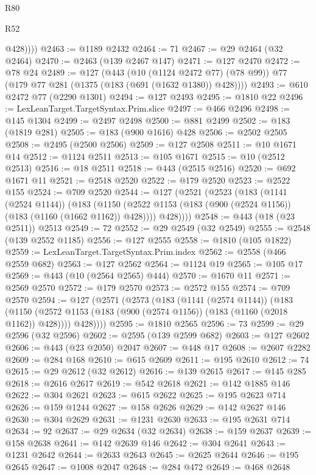 \begin{lexlean}{R80}
\begin{lexlean}{R52}
\begin{coremodule}
{{{{{{{{{{{{{{{{{{{{{{{{{{{{{{{{{{{{{{{{{{{{{{{{{{{{{{{{{{{{{{{{{{{{{{{{{{{{{{{{{{{{{{{{{{{{{{{{{{{{{{{{{{{{{{{{{{{{{{{{{{{{{{{{{{{{{{{{{{{{{{{{{{{{{{{{{{{{{{{{{{{{{{{{{{{{{{{{{{{{{{{{{{{{{{{{{{{{{{            @428))))
@2463 := @1189 @2432
@2464 := 71
@2467 := @29 @2464 (@32 @2464)
@2470 := @2463 (@139 @2467 @147)
@2471 := @127 @2470
@2472 := @78 @24
@2489 := @127
    (@443
      (@10 (@1124 @2472 @77) (@78 @99))
      @77
      (@179 @77 @281 (@1375 (@183 (@691 (@1632 @1380)) @428))))
@2493 := @610 @2472 @77 (@2290 @1301)
@2494 := @127 @2493
@2495 := @1810 @22
@2496 := LexLeanTarget.TargetSyntax.Prim.slice
@2497 := @466 @2496
@2498 := @145 @1304
@2499 := @2497 @2498
@2500 := @881 @2499
@2502 := @183 (@1819 @281)
@2505 := @183 (@900 @1616) @428
@2506 := @2502 @2505
@2508 := @2495 (@2500 @2506)
@2509 := @127 @2508
@2511 := @10 @1671 @14
@2512 := @1124 @2511
@2513 := @105 @1671
@2515 := @10 (@2512 @2513)
@2516 := @18 @2511
@2518 := @443 (@2515 @2516)
@2520 := @692 @1671 @11
@2521 := @2518 @2520
@2522 := @179 @2520
@2523 := @2522 @155
@2524 := @709 @2520
@2544 := @127
    (@2521
      (@2523
        (@183
          (@1141 (@2524 @1144))
          (@183
            (@1150 (@2522 @1153 (@183 (@900 (@2524 @1156)) (@183 (@1160 (@1662 @1162)) @428))))
            @428))))
@2548 := @443 (@18 (@23 @2511)) @2513
@2549 := 72
@2552 := @29 @2549 (@32 @2549)
@2555 := @2548 (@139 @2552 @1185)
@2556 := @127 @2555
@2558 := @1810 (@105 @1822)
@2559 := LexLeanTarget.TargetSyntax.Prim.index
@2562 := @2558 (@466 @2559 @682)
@2563 := @127 @2562
@2564 := @1124 @19
@2565 := @105 @17
@2569 := @443 (@10 (@2564 @2565) @444)
@2570 := @1670 @11
@2571 := @2569 @2570
@2572 := @179 @2570
@2573 := @2572 @155
@2574 := @709 @2570
@2594 := @127
    (@2571
      (@2573
        (@183
          (@1141 (@2574 @1144))
          (@183
            (@1150 (@2572 @1153 (@183 (@900 (@2574 @1156)) (@183 (@1160 (@2018 @1162)) @428))))
            @428))))
@2595 := @1810 @2565
@2596 := 73
@2599 := @29 @2596 (@32 @2596)
@2602 := @2595 (@139 @2599 @682)
@2603 := @127 @2602
@2606 := @443 (@23 @2050) @2047
@2607 := @448 @17
@2608 := @2607 @2282
@2609 := @284 @168
@2610 := @615 @2609
@2611 := @195 @2610
@2612 := 74
@2615 := @29 @2612 (@32 @2612)
@2616 := @139 @2615
@2617 := @145 @285
@2618 := @2616 @2617
@2619 := @542 @2618
@2621 := @142 @1885 @146
@2622 := @304 @2621
@2623 := @615 @2622
@2625 := @195 @2623 @714
@2626 := @159 @1244
@2627 := @158 @2626
@2629 := @142 @2627 @146
@2630 := @304 @2629
@2631 := @1231 @2630
@2633 := @195 @2631 @714
@2634 := 92
@2637 := @29 @2634 (@32 @2634)
@2638 := @159 @2637
@2639 := @158 @2638
@2641 := @142 @2639 @146
@2642 := @304 @2641
@2643 := @1231 @2642
@2644 := @2633 @2643
@2645 := @2625 @2644
@2646 := @195 @2645
@2647 := @1008 @2047
@2648 := @284 @472
@2649 := @468 @2648
}}}}}}}}}}}}}}}}}}}}}}}}}}}}}}}}}}}}}}}}}}}}}}}}}}}}}}}}}}}}}}}}}}}}}}}}}}}}}}}}}}}}}}}}}}}}}}}}}}}}}}}}}}}}}}}}}}}}}}}}}}}}}}}}}}}}}}}}}}}}}}}}}}}}}}}}}}}}}}}}}}}}}}}}}}}}}}}}}}}}}}}}}}}}}}}}}}}}}}
\end{coremodule}
\end{lexlean}
\end{lexlean}
